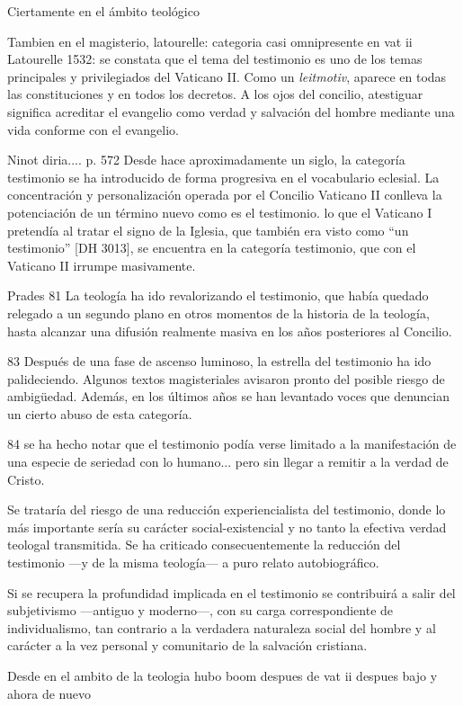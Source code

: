 Ciertamente en el ámbito teológico 


Tambien en el magisterio, latourelle: categoria casi omnipresente en vat ii
Latourelle 1532:
se constata que el tema del testimonio es uno de los temas principales y
privilegiados del Vaticano II. Como un \emph{leitmotiv}, aparece en todas las
constituciones y en todos los decretos. A los ojos del concilio, atestiguar
significa acreditar el evangelio como verdad y salvación del hombre mediante una
vida conforme con el evangelio.

Ninot diria.... p. 572
Desde hace aproximadamente un siglo, la categoría testimonio se ha introducido
de forma progresiva en el vocabulario eclesial. La concentración y
personalización operada por el Concilio Vaticano II conlleva la potenciación de
un término nuevo como es el testimonio. \textelp{} lo que el Vaticano I
pretendía al tratar el signo de la Iglesia, que también era visto como ``un
testimonio'' [DH 3013], se encuentra en la categoría testimonio, que con el
Vaticano II irrumpe masivamente.

Prades 81
La teología ha ido revalorizando el testimonio, que había quedado relegado a un
segundo plano en otros momentos de la historia de la teología, hasta alcanzar
una difusión realmente masiva en los años posteriores al Concilio.

83
Después de una fase de ascenso luminoso, la estrella del testimonio ha ido
palideciendo. Algunos textos magisteriales avisaron pronto del posible riesgo de
ambigüedad. Además, en los últimos años se han levantado voces que denuncian un
cierto abuso de esta categoría.

84
se ha hecho notar que el testimonio podía verse limitado a la manifestación de
una especie de seriedad con lo humano...
pero sin llegar a remitir a la verdad de Cristo.

Se trataría del riesgo de una reducción experiencialista del testimonio, donde
lo más importante sería su carácter social-existencial y no tanto la efectiva
verdad teologal transmitida. Se ha criticado consecuentemente la reducción del
testimonio ---y de la misma teología--- a puro relato autobiográfico.

Si se recupera la profundidad implicada en el testimonio se contribuirá a salir
del subjetivismo ---antiguo y moderno---, con su carga correspondiente de
individualismo, tan contrario a la verdadera naturaleza social del hombre y al
carácter a la vez personal y comunitario de la salvación cristiana.

Desde
en el ambito de la teologia hubo boom despues de vat ii
despues bajo
y ahora de nuevo

